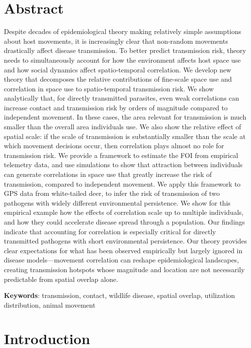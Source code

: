 \documentclass[letterpaper]{article}
\begin{document}
\section*{Abstract} %
Despite decades of epidemiological theory making relatively simple assumptions about host movements, it is increasingly clear that non-random movements drastically affect disease transmission. To better predict transmission risk, theory needs to simultaneously account for how the environment affects host space use and how social dynamics affect spatio-temporal correlation. We develop new theory that decomposes the relative contributions of fine-scale space use and correlation in space use to spatio-temporal transmission risk. We show analytically that, for directly transmitted parasites, even weak correlations can increase contact and transmission risk by orders of magnitude compared to independent movement. In these cases, the area relevant for transmission is much smaller than the overall area individuals use. We also show the relative effect of spatial scale: if the scale of transmission is substantially smaller than the scale at which movement decisions occur, then correlation plays almost no role for transmission risk. We provide a framework to estimate the FOI from empirical telemetry data, and use simulations to show that attraction between individuals can generate correlations in space use that greatly increase the risk of transmission, compared to independent movement. We apply this framework to GPS data from white-tailed deer, to infer the risk of transmission of two pathogens with widely different environmental persistence. We show for this empirical example how the effects of correlation scale up to multiple individuals, and how they could accelerate disease spread through a population. Our findings indicate that accounting for correlation is especially critical for directly transmitted pathogens with short environmental persistence. Our theory provides clear expectations for what has been observed empirically but largely ignored in disease models---movement correlation can reshape epidemiological landscapes, creating transmission hotspots whose magnitude and location are not necessarily predictable from spatial overlap alone.

\bigskip
\noindent
\textbf{Keywords}: transmission, contact, wildlife disease, spatial overlap, utilization distribution, animal movement

\section*{Introduction}
\end{document}
